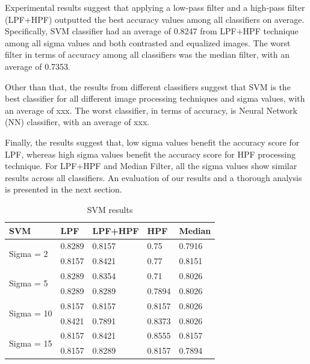 \documentclass[conference]{IEEEtran}
\begin{document}
Experimental results suggest that applying a low-pass filter and a high-pass filter (LPF+HPF) outputted the best accuracy values among all classifiers on average. Specifically, SVM classifier had an average of 0.8247 from LPF+HPF technique among all sigma values and both contrasted and equalized images. The worst filter in terms of accuracy among all classifiers was the median filter, with an average of 0.7353. 

Other than that, the results from different classifiers suggest that SVM is the best classifier for all different image processing techniques and sigma values, with an average of xxx. The worst classifier, in terms of accuracy, is Neural Network (NN) classifier, with an average of xxx. 

Finally, the results suggest that, low sigma values benefit the accuracy score for LPF, whereas high sigma values benefit the accuracy score for HPF processing technique. For LPF+HPF and Median Filter, all the sigma values show similar results across all classifiers. An evaluation of our results and a thorough analysis is presented in the next section. 
\begin{table}[h!]
\centering
\begin{tabular}{ |p{1.4cm}||p{1.1cm}|p{1.3cm}|p{1.1cm}|p{1cm}|  }
\hline
 SVM & LPF &LPF+HPF &HPF & Median\\
 \hline
 \multirow{2}{*}{Sigma = 2} &0.8289 &0.8157& 0.75&0.7916\\ 
 &0.8157	&0.8421&	0.77&0.8151\\
\hline
\multirow{2}{*}{Sigma = 5}  & 0.8289&	0.8354	&0.71	&0.8026\\
&  0.8289& 0.8289	& 0.7894	&0.8026\\
\hline
\multirow{2}{*}{Sigma = 10}  &	0.8157	&0.8157&	0.8157	&0.8026\\
&	0.8421	& 0.7891&0.8373	& 0.8026\\
\hline
\multirow{2}{*}{Sigma = 15} &	0.8157&	0.8421&	0.8555&	0.8157\\
& 0.8157&	 0.8289&	  0.8157&  0.7894\\
 \hline
\end{tabular} \\
\caption{SVM results}
\label{table:1}
\end{table}
\end{document}
